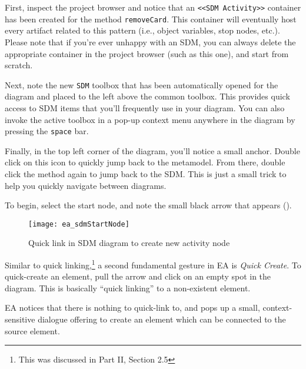 \begin{stepbystep}
\item First, inspect the project browser and notice that an \texttt{<<SDM Activity>>} container has been created for the method
\texttt{removeCard}. This container will eventually host every artifact related to this pattern (i.e., object variables, stop nodes, etc.). Please note
that if you're ever unhappy with an SDM, you can always delete the appropriate container in the project browser (such as this one), and start from scratch.

\item Next, note the new \texttt{SDM} toolbox that has been automatically opened for the diagram and placed to the left above
the common toolbox. This provides quick access to SDM items that you'll frequently use in your diagram. You can also invoke the active toolbox in a pop-up
context menu anywhere in the diagram by pressing the \texttt{space} bar.

\item Finally, in the top left corner of the diagram, you'll notice a small anchor. Double click on this icon to quickly jump back to the
metamodel. From there, double click the method again to jump back to the SDM. This is just a small trick to help you quickly navigate between diagrams.

\newpage

\item To begin, select the start node, and note the small black arrow that appears (). 

\begin{figure}[htp]
\begin{center}
  \texttt{[image: ea\_sdmStartNode]}
  \caption{Quick link in SDM diagram to create new activity node}  
  \label{ea:sdm_quicklink}
\end{center}
\end{figure}

\item Similar to quick linking,\footnote{This was discussed in Part II, Section 2.5} a second fundamental gesture in EA is \emph{Quick
Create}.
To quick-create an element, pull the arrow and click on an empty spot in the diagram. This is basically ``quick linking'' to a non-existent element.

\item EA notices that there is nothing to quick-link to, and pops up a small, context-sensitive dialogue offering to create an element
which can be connected to the source element.


\end{stepbystep}
